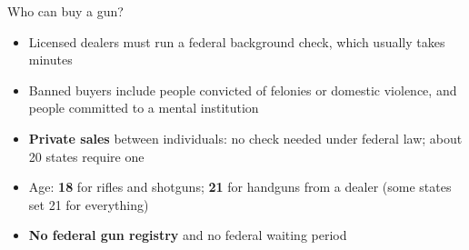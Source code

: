 \documentclass[aspectratio=169,11pt]{beamer}
\begin{document}
\begin{frame}{Who can buy a gun?}
  \begin{itemize}\setlength{\itemsep}{0.7em}
    \item Licensed dealers must run a \alert{federal background check}, which usually takes minutes
    \item Banned buyers include people convicted of felonies or domestic violence, and people committed to a mental institution
    \item \textbf{Private sales} between individuals: no check needed under federal law; about 20 states require one
    \item Age: \textbf{18} for rifles and shotguns; \textbf{21} for handguns from a dealer (some states set 21 for everything)
    \item \textbf{No federal gun registry} and no federal waiting period
  \end{itemize}
\end{frame}
\end{document}
